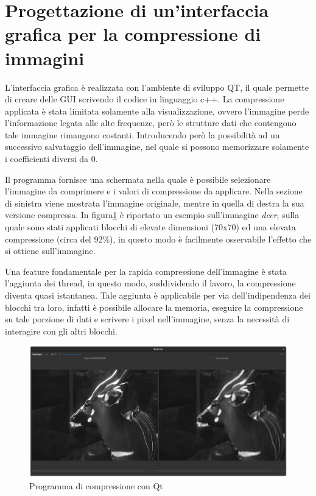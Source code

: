 \part{Progettazione di un'interfaccia grafica per la compressione di immagini}

L'interfaccia grafica è realizzata con l'ambiente di sviluppo QT\cite{qt}, il quale permette di creare delle GUI scrivendo il codice in linguaggio c++. La compressione applicata è stata limitata solamente alla visualizzazione, ovvero l'immagine perde l'informazione legata alle alte frequenze, però le strutture dati che contengono tale immagine rimangono costanti. Introducendo però la possibilità ad un successivo salvataggio dell'immagine, nel quale si possono memorizzare solamente i coefficienti diversi da 0.

Il programma fornisce una schermata nella quale è possibile selezionare l'immagine da comprimere e i valori di compressione da applicare. Nella sezione di sinistra viene mostrata l'immagine originale, mentre in quella di destra la sua versione compressa. In figura\ref{fig:deer} è riportato un esempio sull'immagine \textit{deer}, sulla quale sono stati applicati blocchi di elevate dimensioni (70x70) ed una elevata compressione (circa del 92\%), in questo modo è facilmente osservabile l'effetto che si ottiene sull'immagine.

Una feature fondamentale per la rapida compressione dell'immagine è stata l'aggiunta dei thread, in questo modo, suddividendo il lavoro, la compressione diventa quasi istantanea. Tale aggiunta è applicabile per via dell'indipendenza dei blocchi tra loro, infatti è possibile allocare la memoria, eseguire la compressione su tale porzione di dati e scrivere i pixel nell'immagine, senza la necessità di interagire con gli altri blocchi.

\begin{figure}[h]
	\centering
	\includegraphics[width=1\linewidth]{figures/qt_deer}
	\caption{Programma di compressione con Qt}
	\label{fig:deer}
\end{figure}


